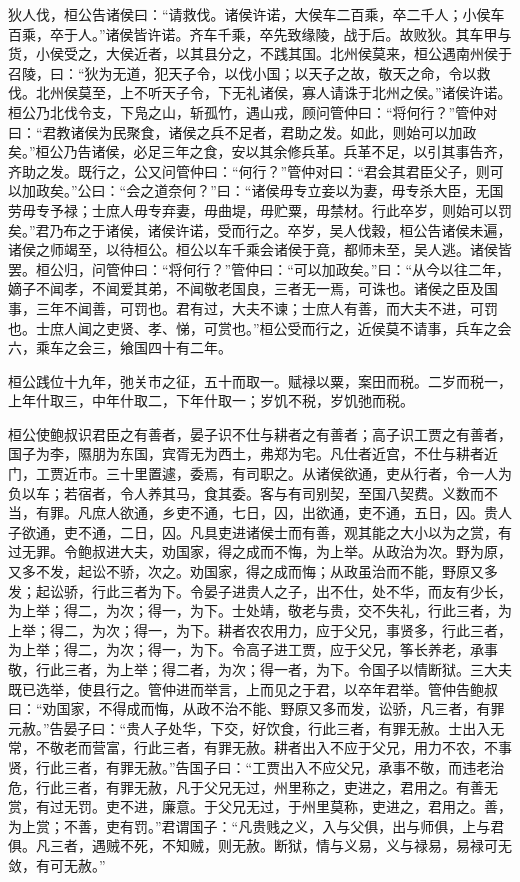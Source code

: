 \documentclass[]{article}
\begin{document}
狄人伐，桓公告诸侯曰：``请救伐。诸侯许诺，大侯车二百乘，卒二千人；小侯车百乘，卒于人。''诸侯皆许诺。齐车千乘，卒先致缘陵，战于后。故败狄。其车甲与货，小侯受之，大侯近者，以其县分之，不践其国。北州侯莫来，桓公遇南州侯于召陵，曰：``狄为无道，犯天子令，以伐小国；以天子之故，敬天之命，令以救伐。北州侯莫至，上不听天子令，下无礼诸侯，寡人请诛于北州之侯。''诸侯许诺。桓公乃北伐令支，下凫之山，斩孤竹，遇山戎，顾问管仲曰：``将何行？''管仲对曰：``君教诸侯为民聚食，诸侯之兵不足者，君助之发。如此，则始可以加政矣。''桓公乃告诸侯，必足三年之食，安以其余修兵革。兵革不足，以引其事告齐，齐助之发。既行之，公又问管仲曰：``何行？''管仲对曰：``君会其君臣父子，则可以加政矣。''公曰：``会之道奈何？''曰：``诸侯毋专立妾以为妻，毋专杀大臣，无国劳毋专予禄；士庶人毋专弃妻，毋曲堤，毋贮粟，毋禁材。行此卒岁，则始可以罚矣。''君乃布之于诸侯，诸侯许诺，受而行之。卒岁，吴人伐穀，桓公告诸侯未遍，诸侯之师竭至，以待桓公。桓公以车千乘会诸侯于竟，都师未至，吴人逃。诸侯皆罢。桓公归，问管仲曰：``将何行？''管仲曰：``可以加政矣。''曰：``从今以往二年，嫡子不闻孝，不闻爱其弟，不闻敬老国良，三者无一焉，可诛也。诸侯之臣及国事，三年不闻善，可罚也。君有过，大夫不谏；士庶人有善，而大夫不进，可罚也。士庶人闻之吏贤、孝、悌，可赏也。''桓公受而行之，近侯莫不请事，兵车之会六，乘车之会三，飨国四十有二年。

桓公践位十九年，弛关市之征，五十而取一。赋禄以粟，案田而税。二岁而税一，上年什取三，中年什取二，下年什取一；岁饥不税，岁饥弛而税。

桓公使鲍叔识君臣之有善者，晏子识不仕与耕者之有善者；高子识工贾之有善者，国子为李，隰朋为东国，宾胥无为西土，弗郑为宅。凡仕者近宫，不仕与耕者近门，工贾近市。三十里置遽，委焉，有司职之。从诸侯欲通，吏从行者，令一人为负以车；若宿者，令人养其马，食其委。客与有司别契，至国八契费。义数而不当，有罪。凡庶人欲通，乡吏不通，七日，囚，出欲通，吏不通，五日，囚。贵人子欲通，吏不通，二日，囚。凡具吏进诸侯士而有善，观其能之大小以为之赏，有过无罪。令鲍叔进大夫，劝国家，得之成而不悔，为上举。从政治为次。野为原，又多不发，起讼不骄，次之。劝国家，得之成而悔；从政虽治而不能，野原又多发；起讼骄，行此三者为下。令晏子进贵人之子，出不仕，处不华，而友有少长，为上举；得二，为次；得一，为下。士处靖，敬老与贵，交不失礼，行此三者，为上举；得二，为次；得一，为下。耕者农农用力，应于父兄，事贤多，行此三者，为上举；得二，为次；得一，为下。令高子进工贾，应于父兄，筝长养老，承事敬，行此三者，为上举；得二者，为次；得一者，为下。令国子以情断狱。三大夫既已选举，使县行之。管仲进而举言，上而见之于君，以卒年君举。管仲告鲍叔曰：``劝国家，不得成而悔，从政不治不能、野原又多而发，讼骄，凡三者，有罪元赦。''告晏子曰：``贵人子处华，下交，好饮食，行此三者，有罪无赦。士出入无常，不敬老而营富，行此三者，有罪无赦。耕者出入不应于父兄，用力不农，不事贤，行此三者，有罪无赦。''告国子曰：``工贾出入不应父兄，承事不敬，而违老治危，行此三者，有罪无赦，凡于父兄无过，州里称之，吏进之，君用之。有善无赏，有过无罚。吏不进，廉意。于父兄无过，于州里莫称，吏进之，君用之。善，为上赏；不善，吏有罚。''君谓国子：``凡贵贱之义，入与父俱，出与师俱，上与君俱。凡三者，遇贼不死，不知贼，则无赦。断狱，情与义易，义与禄易，易禄可无敛，有可无赦。''
\end{document}
